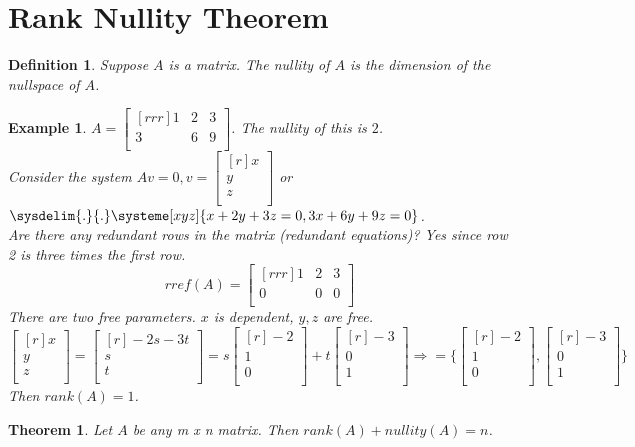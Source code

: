 \documentclass{report}
\newtheorem*{ex}{Example}
\newtheorem*{defn}{Definition}
\newtheorem*{thrm}{Theorem}
\begin{document}
\section{Rank Nullity Theorem}
\begin{defn}
Suppose $A$ is a matrix. The nullity of $A$ is the dimension of the nullspace of $A$.
\end{defn}
\begin{ex}
$A=\begin{bmatrix}[rrr]1&2&3\\3&6&9\\\end{bmatrix}$. The nullity of this is $2$.\\
Consider the system $Av=0, v=\begin{bmatrix}[r]x\\y\\z\\\end{bmatrix}$ or $\sysdelim{.}{.}\systeme[xyz]{x+2y+3z=0,3x+6y+9z=0}$.\\
Are there any redundant rows in the matrix (redundant equations)? Yes since row 2 is three times the first row.\\
\[ rref(A)=\begin{bmatrix}[rrr]1&2&3\\0&0&0\\\end{bmatrix} \]
There are two free parameters. $x$ is dependent, $y,z$ are free.\\
\[ \begin{bmatrix}[r]x\\y\\z\\\end{bmatrix} = \begin{bmatrix}[r]-2s-3t\\s\\t\\\end{bmatrix} = s\begin{bmatrix}[r]-2\\1\\0\\\end{bmatrix}+t\begin{bmatrix}[r]-3\\0\\1\\\end{bmatrix} \Rightarrow = \{\begin{bmatrix}[r]-2\\1\\0\\\end{bmatrix},\begin{bmatrix}[r]-3\\0\\1\\\end{bmatrix}\} \]
Then $rank(A)=1$.
\end{ex}
\begin{thrm}
Let $A$ be any m x n matrix. Then $rank(A)+nullity(A)=n$.
\end{thrm}
\end{document}

